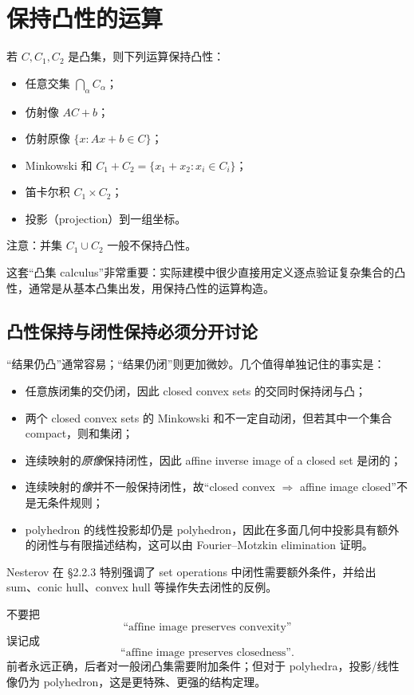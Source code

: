 \documentclass[11pt,a4paper,openany]{ctexrep}
\theoremstyle{definition}
\begin{document}
\section{保持凸性的运算}
若 $C,C_1,C_2$ 是凸集，则下列运算保持凸性：
\begin{itemize}[leftmargin=2em]
  \item 任意交集 $\bigcap_\alpha C_\alpha$；
  \item 仿射像 $AC+b$；
  \item 仿射原像 $\{x:Ax+b\in C\}$；
  \item Minkowski 和 $C_1+C_2=\{x_1+x_2:x_i\in C_i\}$；
  \item 笛卡尔积 $C_1\times C_2$；
  \item 投影（projection）到一组坐标。
\end{itemize}
注意：并集 $C_1\cup C_2$ 一般不保持凸性。

这套“凸集 calculus”非常重要：实际建模中很少直接用定义逐点验证复杂集合的凸性，通常是从基本凸集出发，用保持凸性的运算构造。\cite[\S2.3]{boyd}


\subsection{凸性保持与闭性保持必须分开讨论}
“结果仍凸”通常容易；“结果仍闭”则更加微妙。几个值得单独记住的事实是：
\begin{itemize}[leftmargin=2em]
  \item 任意族闭集的交仍闭，因此 closed convex sets 的交同时保持闭与凸；
  \item 两个 closed convex sets 的 Minkowski 和不一定自动闭，但若其中一个集合 compact，则和集闭；
  \item 连续映射的\emph{原像}保持闭性，因此 affine inverse image of a closed set 是闭的；
  \item 连续映射的\emph{像}并不一般保持闭性，故“closed convex $\Rightarrow$ affine image closed”不是无条件规则；
  \item polyhedron 的线性投影却仍是 polyhedron，因此在多面几何中投影具有额外的闭性与有限描述结构，这可以由 Fourier--Motzkin elimination 证明。
\end{itemize}
Nesterov 在 \S2.2.3 特别强调了 set operations 中闭性需要额外条件，并给出 sum、conic hull、convex hull 等操作失去闭性的反例。\cite[\S2.2.3]{nesterov}

\begin{warningbox}[一个非常常见的逻辑错误]
不要把
\[
\text{``affine image preserves convexity''}
\]
误记成
\[
\text{``affine image preserves closedness''}.
\]
前者永远正确，后者对一般闭凸集需要附加条件；但对于 polyhedra，投影/线性像仍为 polyhedron，这是更特殊、更强的结构定理。
\end{warningbox}
\end{document}
